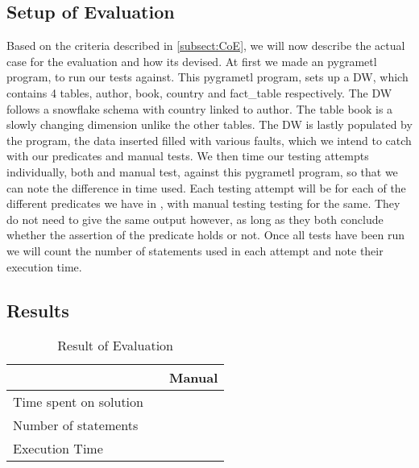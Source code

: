 \subsection{Setup of Evaluation}
Based on the criteria described in \cref{subsect:CoE}, we will now describe the actual case for the evaluation and how its devised. At first we made an pygrametl program, to run our tests against. This pygrametl program, sets up a DW, which contains 4 tables, author, book, country and fact\_table respectively. The DW follows a snowflake schema with country linked to author. The table book is a slowly changing dimension unlike the other tables.
The DW is lastly populated by the program, the data inserted filled with various faults, which we intend to catch with our predicates and manual tests.
We then time our testing attempts individually, both \FW{} and manual test, against this pygrametl program, so that we can note the difference in time used. Each testing attempt will be for each of the different predicates we have in \FW{}, with manual testing testing for the same. They do not need to give the same output however, as long as they both conclude whether the assertion of the predicate holds or not. Once all tests have been run we will count the number of statements used in each attempt and note their execution time.


\subsection{Results}

\begin{table}[h]
\centering
\caption{Result of Evaluation}
\label{table:result}
\begin{tabular}{|p{}|p{}|p{}|}
\hline
												& \FW{}	 	& Manual				  \\ \hline
Time spent on solution 	&         &                	\\ \hline
Number of statements   	&         &                	\\ \hline
Execution Time         	&         &                	\\ \hline
\end{tabular}
\end{table}









